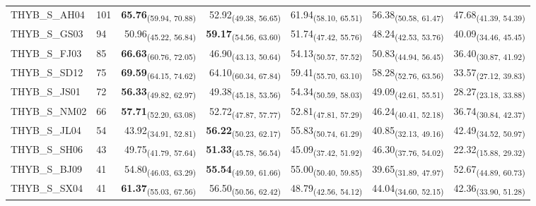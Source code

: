 \begin{table}[p]
\begin{tabular}{llrrrrr}
THYB\_S\_AH04 & 101 & \textbf{65.76}\textsubscript{(59.94, 70.88)} & 52.92\textsubscript{(49.38, 56.65)} & 61.94\textsubscript{(58.10, 65.51)} & 56.38\textsubscript{(50.58, 61.47)} & 47.68\textsubscript{(41.39, 54.39)} \\
THYB\_S\_GS03 & 94 & 50.96\textsubscript{(45.22, 56.84)} & \textbf{59.17}\textsubscript{(54.56, 63.60)} & 51.74\textsubscript{(47.42, 55.76)} & 48.24\textsubscript{(42.53, 53.76)} & 40.09\textsubscript{(34.46, 45.45)} \\
THYB\_S\_FJ03 & 85 & \textbf{66.63}\textsubscript{(60.76, 72.05)} & 46.90\textsubscript{(43.13, 50.64)} & 54.13\textsubscript{(50.57, 57.52)} & 50.83\textsubscript{(44.94, 56.45)} & 36.40\textsubscript{(30.87, 41.92)} \\
THYB\_S\_SD12 & 75 & \textbf{69.59}\textsubscript{(64.15, 74.62)} & 64.10\textsubscript{(60.34, 67.84)} & 59.41\textsubscript{(55.70, 63.10)} & 58.28\textsubscript{(52.76, 63.56)} & 33.57\textsubscript{(27.12, 39.83)} \\
THYB\_S\_JS01 & 72 & \textbf{56.33}\textsubscript{(49.82, 62.97)} & 49.38\textsubscript{(45.18, 53.56)} & 54.34\textsubscript{(50.59, 58.03)} & 49.09\textsubscript{(42.61, 55.51)} & 28.27\textsubscript{(23.18, 33.88)} \\
THYB\_S\_NM02 & 66 & \textbf{57.71}\textsubscript{(52.20, 63.08)} & 52.72\textsubscript{(47.87, 57.77)} & 52.81\textsubscript{(47.81, 57.29)} & 46.24\textsubscript{(40.41, 52.18)} & 36.74\textsubscript{(30.84, 42.37)} \\
THYB\_S\_JL04 & 54 & 43.92\textsubscript{(34.91, 52.81)} & \textbf{56.22}\textsubscript{(50.23, 62.17)} & 55.83\textsubscript{(50.74, 61.29)} & 40.85\textsubscript{(32.13, 49.16)} & 42.49\textsubscript{(34.52, 50.97)} \\
THYB\_S\_SH06 & 43 & 49.75\textsubscript{(41.79, 57.64)} & \textbf{51.33}\textsubscript{(45.78, 56.54)} & 45.09\textsubscript{(37.42, 51.92)} & 46.30\textsubscript{(37.76, 54.02)} & 22.32\textsubscript{(15.88, 29.32)} \\
THYB\_S\_BJ09 & 41 & 54.80\textsubscript{(46.03, 63.29)} & \textbf{55.54}\textsubscript{(49.59, 61.66)} & 55.00\textsubscript{(50.40, 59.85)} & 39.65\textsubscript{(31.89, 47.97)} & 52.67\textsubscript{(44.89, 60.73)} \\
THYB\_S\_SX04 & 41 & \textbf{61.37}\textsubscript{(55.03, 67.56)} & 56.50\textsubscript{(50.56, 62.42)} & 48.79\textsubscript{(42.56, 54.12)} & 44.04\textsubscript{(34.60, 52.15)} & 42.36\textsubscript{(33.90, 51.28)} \\

\end{tabular}
\end{table}
